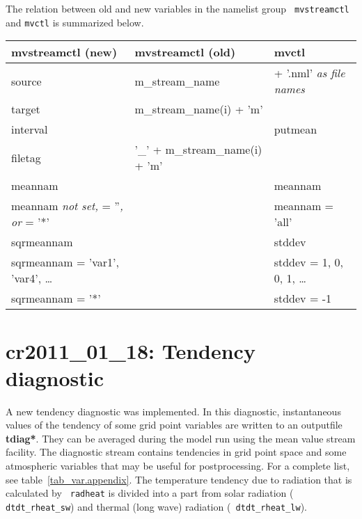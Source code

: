 \begin{appendix}
The relation between old and new variables in the namelist group {\tt
  mvstreamctl} and {\tt mvctl} is summarized below.

\vspace{\baselineskip}
\begin{tabular}{|l|l|l|} \hline
\textbf{mvstreamctl (new)} & \textbf{mvstreamctl (old)} & \textbf{mvctl} \\\hline
source & m\_stream\_name & + '.nml' \emph{as file names} \\\hline
target & m\_stream\_name(i) + 'm' & \\\hline
interval & & putmean \\\hline
filetag & '\_' + m\_stream\_name(i) + 'm' & \\\hline
meannam & & meannam \\\hline
meannam \emph{not set,} = ''\emph{, or} = '*' & & meannam = 'all' \\\hline
sqrmeannam & & stddev \\\hline
sqrmeannam = 'var1', 'var4', \dots & & stddev = 1, 0, 0, 1, \dots \\\hline
sqrmeannam = '*' & & stddev = -1 \\\hline
\end{tabular}
\vspace{\baselineskip}

\clearpage\newpage
\section{cr2011\_01\_18: Tendency diagnostic}\label{cr20110118}

A new tendency diagnostic was implemented. In this diagnostic,
instantaneous values of the tendency of some grid point variables are
written to an outputfile {\bf *tdiag*}. They can be
averaged during the model run using the mean value stream
facility. The diagnostic stream contains tendencies in grid point
space and some atmospheric variables that may be useful for
postprocessing. For a complete list, see table~\ref{tab_var.appendix}. The
temperature tendency due to radiation that is calculated by {\tt
  radheat} is divided into a part from solar radiation ({\tt
  dtdt\_rheat\_sw}) and thermal (long wave) radiation ({\tt
  dtdt\_rheat\_lw}). 


\end{appendix}

